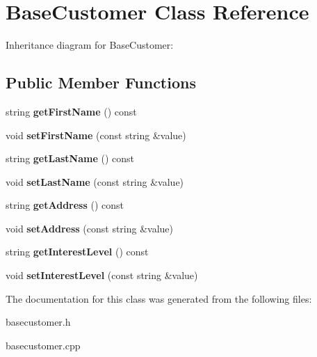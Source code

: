 \section{Base\+Customer Class Reference}
\label{class_base_customer}


Inheritance diagram for Base\+Customer\+:
\subsection*{Public Member Functions}
\begin{DoxyCompactItemize}
\item 
\mbox{\label{class_base_customer_ab713ae910ec8f3005cc1986820c7734c}} 
string {\bfseries get\+First\+Name} () const
\item 
\mbox{\label{class_base_customer_ab429809a2974e77654ef2602c1be0174}} 
void {\bfseries set\+First\+Name} (const string \&value)
\item 
\mbox{\label{class_base_customer_ac889925255f767ff6262be705a7d5fc2}} 
string {\bfseries get\+Last\+Name} () const
\item 
\mbox{\label{class_base_customer_a727eaeb8a264e7fc8e5395b2c14413a0}} 
void {\bfseries set\+Last\+Name} (const string \&value)
\item 
\mbox{\label{class_base_customer_ab4e35abeeb5bd848a4c6e33f48003691}} 
string {\bfseries get\+Address} () const
\item 
\mbox{\label{class_base_customer_a86c39fa0dae3dc9a1e4303d04e2306ca}} 
void {\bfseries set\+Address} (const string \&value)
\item 
\mbox{\label{class_base_customer_a37960b08990512fce03fd0c3c659adf7}} 
string {\bfseries get\+Interest\+Level} () const
\item 
\mbox{\label{class_base_customer_a1ff40937b469452511953846dd57af85}} 
void {\bfseries set\+Interest\+Level} (const string \&value)
\end{DoxyCompactItemize}


The documentation for this class was generated from the following files\+:\begin{DoxyCompactItemize}
\item 
basecustomer.\+h\item 
basecustomer.\+cpp\end{DoxyCompactItemize}
